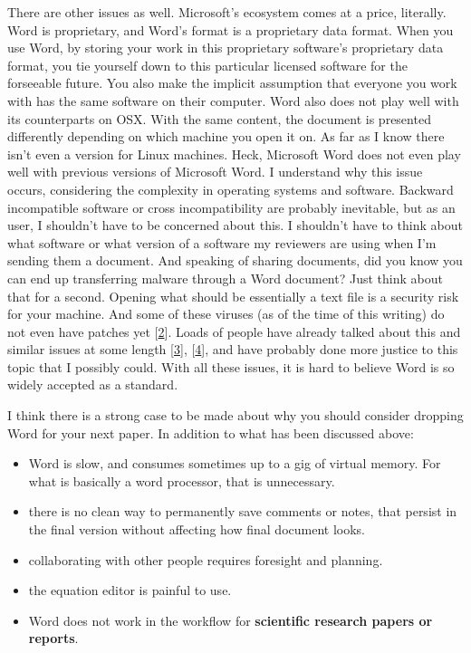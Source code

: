 \documentclass[journal,]{IEEEtran}
\providecommand{\tightlist}{%
  \setlength{\itemsep}{0pt}\setlength{\parskip}{0pt}}
\begin{document}
There are other issues as well. Microsoft's ecosystem comes at a price,
literally. Word is proprietary, and Word's format is a proprietary data
format. When you use Word, by storing your work in this proprietary
software's proprietary data format, you tie yourself down to this
particular licensed software for the forseeable future. You also make
the implicit assumption that everyone you work with has the same
software on their computer. Word also does not play well with its
counterparts on OSX. With the same content, the document is presented
differently depending on which machine you open it on. As far as I know
there isn't even a version for Linux machines. Heck, Microsoft Word does
not even play well with previous versions of Microsoft Word. I
understand why this issue occurs, considering the complexity in
operating systems and software. Backward incompatible software or cross
incompatibility are probably inevitable, but as an user, I shouldn't
have to be concerned about this. I shouldn't have to think about what
software or what version of a software my reviewers are using when I'm
sending them a document. And speaking of sharing documents, did you know
you can end up transferring malware through a Word document? Just think
about that for a second. Opening what should be essentially a text file
is a security risk for your machine. And some of these viruses (as of
the time of this writing) do not even have patches yet
{[}\protect\hyperlink{ref-beaumont_bypass_2015}{2}{]}. Loads of people
have already talked about this and similar issues at some length
{[}\protect\hyperlink{ref-steingold_proprietary_nodate}{3}{]},
{[}\protect\hyperlink{ref-cottrell_word_nodate}{4}{]}, and have probably
done more justice to this topic that I possibly could. With all these
issues, it is hard to believe Word is so widely accepted as a standard.

I think there is a strong case to be made about why you should consider
dropping Word for your next paper. In addition to what has been
discussed above:

\begin{itemize}
\tightlist
\item
  Word is slow, and consumes sometimes up to a gig of virtual memory.
  For what is basically a word processor, that is unnecessary.
\item
  there is no clean way to permanently save comments or notes, that
  persist in the final version without affecting how final document
  looks.
\item
  collaborating with other people requires foresight and planning.
\item
  the equation editor is painful to use.
\item
  Word does not work in the workflow for \textbf{scientific research
  papers or reports}.
\end{itemize}
\end{document}
